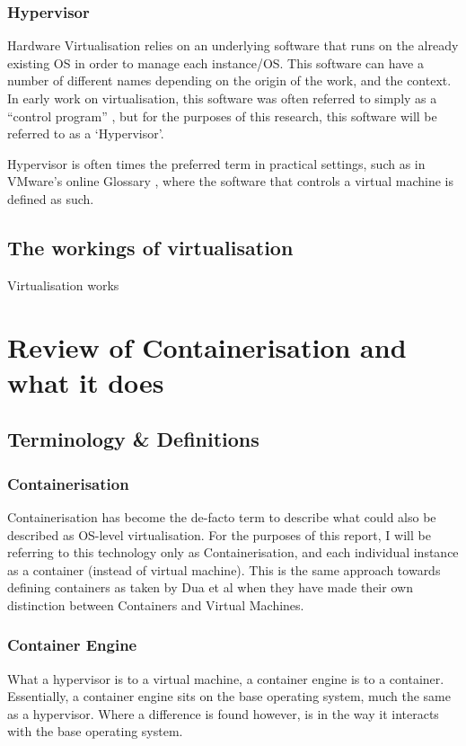 \subsection{Hypervisor}
\label{subsec:hypervisor}
Hardware Virtualisation relies on an underlying software that runs on the already existing OS in order to manage each instance/OS. This software can have a number of different names depending on the origin of the work, and the context. In early work on virtualisation, this software was often referred to simply as a ``control program'' \citep{creasy1981}, but for the purposes of this research, this software will be referred to as a `Hypervisor'.

Hypervisor is often times the preferred term in practical settings, such as in VMware's online Glossary \citep{vmwareHypervisor}, where the software that controls a virtual machine is defined as such.

\section{The workings of virtualisation}
Virtualisation works


\chapter{Review of Containerisation and what it does}
\section{Terminology \& Definitions}

\subsection{Containerisation}
\label{subsec:containerisation}
Containerisation has become the de-facto term to describe what could also be described as OS-level virtualisation. For the purposes of this report, I will be referring to this technology only as Containerisation, and each individual instance as a container (instead of virtual machine). This is the same approach towards defining containers as taken by Dua et al \citep{dua14} when they have made their own distinction between Containers and Virtual Machines.

\subsection{Container Engine}
What a hypervisor is to a virtual machine, a container engine is to a container. Essentially, a container engine sits on the base operating system, much the same as a hypervisor. Where a difference is found however, is in the way it interacts with the base operating system.

